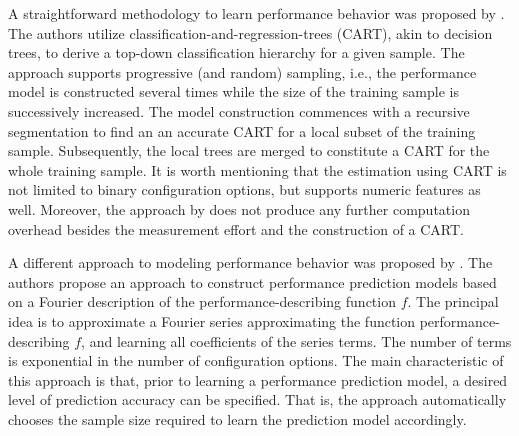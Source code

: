 A straightforward
methodology to learn performance behavior was proposed by \cite{guo_variability-aware_2013}. The
authors utilize classification-and-regression-trees (CART), akin to decision
trees, to derive a top-down classification hierarchy for a given sample. The
approach supports progressive (and random) sampling, i.e., the performance
model is constructed several times while the size of the training sample is
successively increased. The model construction commences with a recursive
segmentation to find an an accurate CART for a local subset of the training
sample. Subsequently, the local trees are merged to constitute a CART for the
whole training sample. It is worth mentioning that the estimation using CART is
not limited to binary configuration options, but supports numeric features as
well. Moreover, the approach by \cite{guo_variability-aware_2013} does not produce any further
computation overhead besides the measurement effort and the construction of a
CART.

A different approach to modeling performance behavior was
proposed by \cite{zhang_performance_2015}. The authors propose an approach to construct
performance prediction models based on a Fourier description of the
performance-describing function $f$. The principal idea is to approximate a
Fourier series approximating the function performance-describing $f$, and
learning all coefficients of the series terms.
The number of terms is exponential in the number of configuration options. The main
characteristic of this approach is that, prior to learning a performance
prediction model, a desired level of prediction accuracy can be specified. That
is, the approach automatically chooses the sample size required to learn the
prediction model accordingly.

